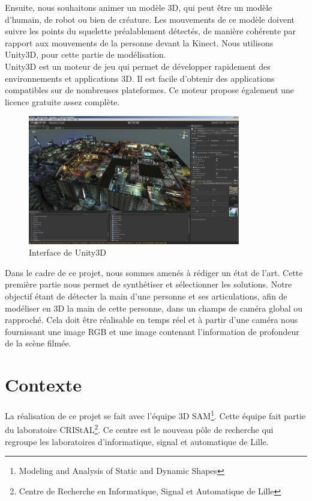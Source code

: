 Ensuite, nous souhaitons animer un modèle 3D, qui peut être un modèle 
d'humain, de robot ou bien de créature. Les mouvements de ce modèle 
doivent suivre les points du squelette préalablement détectés, de 
manière cohérente par rapport aux mouvements de la personne devant la 
Kinect. Nous utilisons Unity3D, pour cette partie de 
modélisation.\\

Unity3D est un moteur de jeu qui permet de développer rapidement des 
environnements et applications 3D. Il est facile d'obtenir des 
applications compatibles sur de nombreuses plateformes. Ce moteur 
propose également une licence gratuite assez complète.\\

\begin{figure}[H]
  \begin{center}
    \includegraphics[width=350px]{images/Unity3D.jpg}
    \caption{Interface de Unity3D}
  \end{center}
\end{figure}

Dans le cadre de ce projet, nous sommes amenés à rédiger un état de
l'art. Cette première partie nous permet de synthétiser et sélectionner 
les solutions. Notre objectif étant de détecter la main d'une personne 
et ses articulations, afin de modéliser en 3D la main de 
cette personne, dans un champs de caméra global ou rapproché. Cela 
doit être réalisable en temps réel et à partir d'une caméra nous 
fournissant une image RGB et une image contenant l'information de 
profondeur de la scène filmée.\\

\section{Contexte}
La réalisation de ce projet se fait avec l'équipe 3D 
SAM\footnote{Modeling and Analysis of Static and Dynamic Shapes}. 
Cette équipe fait partie du laboratoire CRIStAL\footnote{Centre de Recherche 
en Informatique, Signal et Automatique de Lille}. Ce centre est le 
nouveau pôle de recherche qui regroupe les laboratoires d'informatique, 
signal et automatique de Lille.\\

